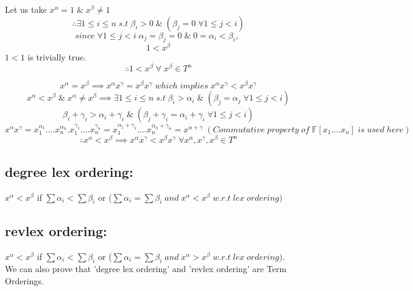 Let us take $x^{\alpha}=1\;\&\;x^{\beta}\neq1$
$$\therefore\exists 1\leq i\leq n\;s.t\;\beta_{i}>0 \;\&\;(\beta_{j}=0 \;\forall 1\leq j<i)$$
$$since\;\forall 1\leq j<i \;\alpha_{j}=\beta_{j}=0\;\&\;0=\alpha_{i}<\beta_{i},\;$$
$$1<x^{\beta}$$
$1<1$ is trivially true.
$$\therefore1<x^{\beta}\;\forall\;x^{\beta}\in T^{n}$$

$$x^{\alpha}=x^{\beta} \implies x^{\alpha}x^{\gamma}=x^{\beta}x^{\gamma}\;which\;implies\;x^{\alpha}x^{\gamma}<x^{\beta}x^{\gamma}$$
$$x^{\alpha}<x^{\beta} \;\&\;x^{\alpha}\neq x^{\beta}\implies \exists 1\leq i\leq n\;s.t\;\beta_{i}>\alpha_{i} \;\&\;(\beta_{j}=\alpha_{j} \;\forall 1\leq j<i)$$ 
$$\beta_{i}+\gamma_{i}>\alpha_{i}+\gamma_{i} \;\&\;(\beta_{j}+\gamma_{i}=\alpha_{i}+\gamma_{i} \;\forall 1\leq j<i)$$
$$x^{\alpha}x^{\gamma}=x_{1}^{\alpha_{1}}....x_{n}^{\alpha_{n}}.x_{1}^{\gamma_{1}}....x_{n}^{\gamma_{n}}=x_{1}^{\alpha_{1}+\gamma_{1}}....x_{n}^{\alpha_{n}+\gamma_{n}}=x^{\alpha+\gamma}\;(Commutative \;property \;of \;\mathbb{F}[x_{1}....x_{n}] \;is \;used \;here) $$
$$\therefore x^{\alpha}<x^{\beta}\implies x^{\alpha}x^{\gamma}<x^{\beta}x^{\gamma}\; \forall x^{\alpha},x^{\gamma},x^{\beta}\in T^{n}$$
\subsection*{degree lex ordering:}
$x^{\alpha}<x^{\beta}$ if $\sum\alpha_{i}<\sum\beta_{i}$ or ($\sum\alpha_{i}=\sum\beta_{i}\; and\; x^{\alpha}<x^{\beta}\; w.r.t \;lex\; ordering)$
\subsection*{revlex ordering:}
$x^{\alpha}<x^{\beta}$ if $\sum\alpha_{i}<\sum\beta_{i}$ or ($\sum\alpha_{i}=\sum\beta_{i}\; and\; x^{\alpha}>x^{\beta}\; w.r.t\; lex \;ordering)$.
$$$$
We can also prove that 'degree lex ordering' and 'revlex ordering' are Term Orderings.
